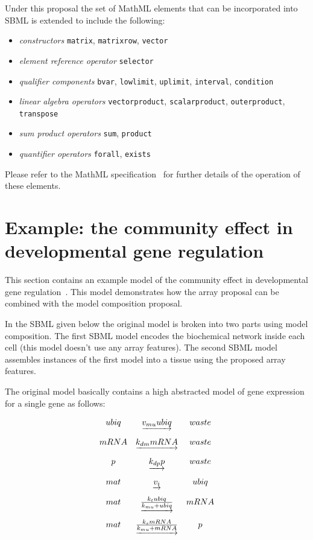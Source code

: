 \documentclass{cekarticle}
\begin{document}
Under this proposal the set of MathML elements that can be incorporated into SBML is extended 
to include the following:
\begin{itemize}
\item \emph{constructors} \texttt{matrix}, \texttt{matrixrow}, \texttt{vector}
\item \emph{element reference operator} \texttt{selector}
\item \emph{qualifier components} \texttt{bvar}, \texttt{lowlimit}, \texttt{uplimit}, \texttt{interval}, \texttt{condition}
\item \emph{linear algebra operators} \texttt{vectorproduct}, \texttt{scalarproduct}, \texttt{outerproduct}, \texttt{transpose}
\item \emph{sum product operators} \texttt{sum}, \texttt{product}
\item \emph{quantifier operators} \texttt{forall}, \texttt{exists}
\end{itemize}

Please refer to the MathML specification~\citep{w3c:2000b} for further details of the operation of these elements.

\section{Example: the community effect in developmental gene regulation}

This section contains an example model of the community effect in
developmental gene regulation~\citep{gurdon:1988}.  This model demonstrates how
the array proposal can be combined with the model composition proposal.

In the SBML given below the original model is broken into two parts using model composition.
The first SBML model
encodes the biochemical network inside each cell (this model doesn't use any array features).
The second SBML model assembles instances of the first model into a tissue using the proposed array features.

The original model basically contains a
high abstracted model of gene expression for a single gene as follows:

\begin{equation*}
  \begin{array}{@{}ccc@{}}
    ubiq & \underrightarrow{v_{mu} ubiq} & waste \\ \\[-4pt]
    mRNA & \underrightarrow{k_{dm} mRNA} & waste \\ \\[-4pt]
    p & \underrightarrow{k_{dp} p} & waste \\ \\[-4pt]
    mat & \underrightarrow{v_i} & ubiq \\ \\[-4pt]
    mat & \underrightarrow{\frac{k_t ubiq}{k_{mu} + ubiq}} & mRNA \\ \\[-4pt]
    mat & \underrightarrow{\frac{k_s mRNA}{k_{mu} + mRNA}} & p
  \end{array}
\end{equation*}
\end{document}
